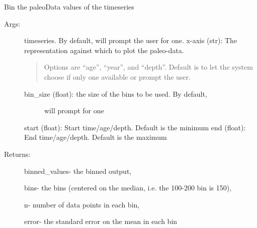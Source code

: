 \documentclass[letterpaper,10pt,english]{sphinxmanual}
\begin{document}
\begin{fulllineitems}
\label{\detokenize{Main:pyleoclim.binTs}}
Bin the paleoData values of the timeseries
\begin{description}
\item[{Args:}] \leavevmode
timeseries. By default, will prompt the user for one.
x-axis (str): The representation against which to plot the paleo-data.
\begin{quote}

Options are “age”, “year”, and “depth”. Default is to let the
system  choose if only one available or prompt the user.
\end{quote}
\begin{description}
\item[{bin\_size (float): the size of the bins to be used. By default,}] \leavevmode
will prompt for one

\end{description}

start (float): Start time/age/depth. Default is the minimum
end (float): End time/age/depth. Default is the maximum

\item[{Returns:}] \leavevmode
binned\_values- the binned output,

bins-  the bins (centered on the median, i.e. the 100-200 bin is 150),

n-  number of data points in each bin,

error- the standard error on the mean in each bin

\end{description}

\end{fulllineitems}

\end{document}
